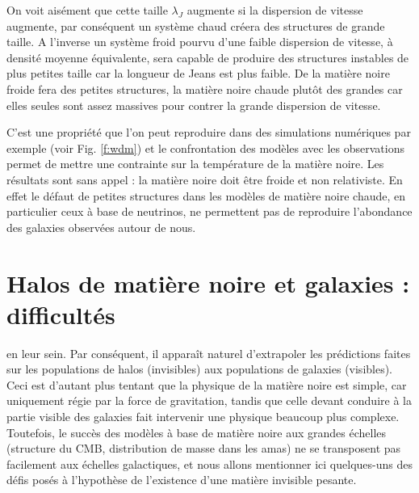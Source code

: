 On voit aisément que cette taille $\lambda_J$ augmente si la dispersion de vitesse augmente, par conséquent un système chaud créera des structures de grande taille. A l'inverse un système froid pourvu d'une faible dispersion de vitesse, à densité moyenne équivalente, sera capable de produire des structures instables de plus petites taille car la longueur de Jeans est plus faible. De la matière noire froide fera des petites structures, la matière noire chaude  plutôt des grandes car elles seules sont assez massives pour contrer la grande dispersion de vitesse. 

C'est une propriété que l'on peut reproduire dans des simulations numériques par exemple (voir Fig. \ref{f:wdm}) et le confrontation des modèles avec les observations permet de mettre une contrainte sur la température de la matière noire. Les résultats sont sans appel : la matière noire doit être froide et non relativiste. En effet le défaut de petites structures dans les modèles de matière noire chaude, en particulier ceux à base de neutrinos, ne permettent pas de reproduire l'abondance des galaxies observées autour de nous.

\section{Halos de matière noire et galaxies : difficultés}
 en leur sein. Par conséquent, il apparaît naturel d'extrapoler les prédictions faites sur les populations de halos (invisibles) aux populations de galaxies (visibles). Ceci est d'autant plus tentant que la physique de la matière noire est simple, car uniquement régie par la force de gravitation, tandis que celle devant conduire à la partie visible des galaxies fait intervenir une physique beaucoup plus complexe. Toutefois, le succès des modèles à base de matière noire aux grandes échelles (structure du CMB, distribution de masse dans les amas) ne se transposent pas facilement aux échelles galactiques, et nous allons mentionner ici quelques-uns des défis posés à l'hypothèse de l'existence d'une matière invisible pesante.

